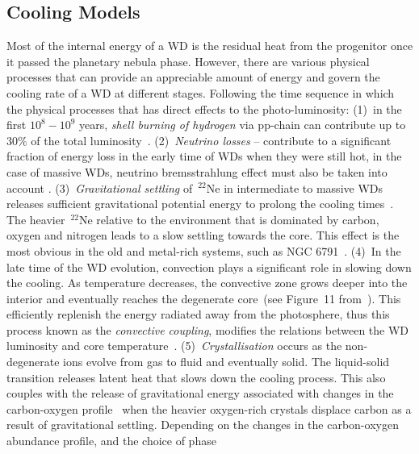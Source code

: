 \documentclass[fleqn,usenatbib]{rasti}
\begin{document}
\subsection{Cooling Models}
Most of the internal energy of a WD is the residual heat from the progenitor
once it passed the planetary nebula phase. However, there are various physical
processes that can provide an appreciable amount of energy and govern the
cooling rate of a WD at different stages. Following the time sequence in which
the physical processes that has direct effects to the photo-luminosity: (1)~in
the first $10^8-10^9$ years, \textit{shell burning of hydrogen} via pp-chain
can contribute up to $30\%$ of the total luminosity~\citep{2010ApJ...717..183R}.
(2)~\textit{Neutrino losses} -- contribute to a significant fraction of energy
loss in the early time of WDs when they were still hot, in the case of massive
WDs, neutrino bremsstrahlung effect must also be taken into account
\citep{1994ApJ...425..222H, 1996ApJS..102..411I}. (3)~\textit{Gravitational
settling} of\ $^{22}$Ne in intermediate to massive WDs releases sufficient
gravitational potential energy to prolong the cooling
times~\citep{2002ApJ...580.1077D, 2008ApJ...677..473G, 2010ApJ...719..612A}.
The heavier\ $^{22}$Ne relative to the environment that is dominated by carbon,
oxygen and nitrogen leads to a slow settling towards the core. This effect is
the most obvious in the old and metal-rich systems, such as NGC
6791~\citep{2010Natur.465..194G, 2008ApJ...678.1279B}. (4)~In the late time of
the WD evolution, convection plays a significant role in slowing down the
cooling. As temperature decreases, the convective zone grows deeper into the
interior and eventually reaches the degenerate core~(see Figure~11
from~\citealt{2010A&ARv..18..471A}). This efficiently replenish the energy
radiated away from the photosphere, thus this process known as the
\textit{convective coupling}, modifies the relations between the WD luminosity
and core temperature~\citep{1989ApJ...347..934D, 2001PASP..113..409F}.
(5)~\textit{Crystallisation} occurs as the non-degenerate ions evolve from gas
to fluid and eventually solid. The liquid-solid transition releases latent
heat that slows down the cooling process. This also couples with the release
of gravitational energy associated with changes in the carbon-oxygen
profile~\citep{1997ApJ...486..413S} when the heavier oxygen-rich crystals
displace carbon as a result of gravitational settling. Depending on the
changes in the carbon-oxygen abundance profile, and the choice of phase
\end{document}
